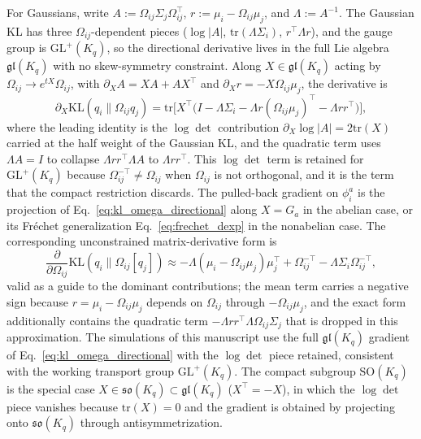 \documentclass[11pt]{article}
\begin{document}
For Gaussians, write $A := \Omega_{ij}\Sigma_j\Omega_{ij}^\top$, $r := \mu_i - \Omega_{ij}\mu_j$, and $\Lambda := A^{-1}$. The Gaussian KL has three $\Omega_{ij}$-dependent pieces ($\log|A|$, $\mathrm{tr}(\Lambda\Sigma_i)$, $r^\top\Lambda r$), and the gauge group is $\mathrm{GL}^+(K_q)$, so the directional derivative lives in the full Lie algebra $\mathfrak{gl}(K_q)$ with no skew-symmetry constraint. Along $X \in \mathfrak{gl}(K_q)$ acting by $\Omega_{ij} \to e^{tX}\Omega_{ij}$, with $\partial_X A = XA + AX^\top$ and $\partial_X r = -X\Omega_{ij}\mu_j$, the derivative is
\begin{equation}
\partial_X\mathrm{KL}(q_i\|\Omega_{ij}q_j) = \mathrm{tr}\Big[X^\top\Big(I - \Lambda\Sigma_i - \Lambda r(\Omega_{ij}\mu_j)^\top - \Lambda r r^\top\Big)\Big],
\label{eq:kl_omega_directional}
\end{equation}
where the leading identity is the $\log\det$ contribution $\partial_X\log|A| = 2\mathrm{tr}(X)$ carried at the half weight of the Gaussian KL, and the quadratic term uses $\Lambda A = I$ to collapse $\Lambda r r^\top\Lambda A$ to $\Lambda r r^\top$. This $\log\det$ term is retained for $\mathrm{GL}^+(K_q)$ because $\Omega_{ij}^{-\top} \neq \Omega_{ij}$ when $\Omega_{ij}$ is not orthogonal, and it is the term that the compact restriction discards. The pulled-back gradient on $\phi_i^a$ is the projection of Eq.~\eqref{eq:kl_omega_directional} along $X = G_a$ in the abelian case, or its Fr\'echet generalization Eq.~\eqref{eq:frechet_dexp} in the nonabelian case. The corresponding unconstrained matrix-derivative form is
\begin{equation}
\frac{\partial}{\partial \Omega_{ij}}\mathrm{KL}(q_i \| \Omega_{ij}[q_j]) \approx -\Lambda(\mu_i - \Omega_{ij}\mu_j)\mu_j^\top + \Omega_{ij}^{-\top} - \Lambda \Sigma_i \Omega_{ij}^{-\top},
\label{eq:kl_omega_unconstrained}
\end{equation}
valid as a guide to the dominant contributions; the mean term carries a negative sign because $r = \mu_i - \Omega_{ij}\mu_j$ depends on $\Omega_{ij}$ through $-\Omega_{ij}\mu_j$, and the exact form additionally contains the quadratic term $-\Lambda r r^\top\Lambda\Omega_{ij}\Sigma_j$ that is dropped in this approximation. The simulations of this manuscript use the full $\mathfrak{gl}(K_q)$ gradient of Eq.~\eqref{eq:kl_omega_directional} with the $\log\det$ piece retained, consistent with the working transport group $\mathrm{GL}^+(K_q)$. The compact subgroup $\mathrm{SO}(K_q)$ is the special case $X \in \mathfrak{so}(K_q) \subset \mathfrak{gl}(K_q)$ ($X^\top = -X$), in which the $\log\det$ piece vanishes because $\mathrm{tr}(X) = 0$ and the gradient is obtained by projecting onto $\mathfrak{so}(K_q)$ through antisymmetrization.
\end{document}
